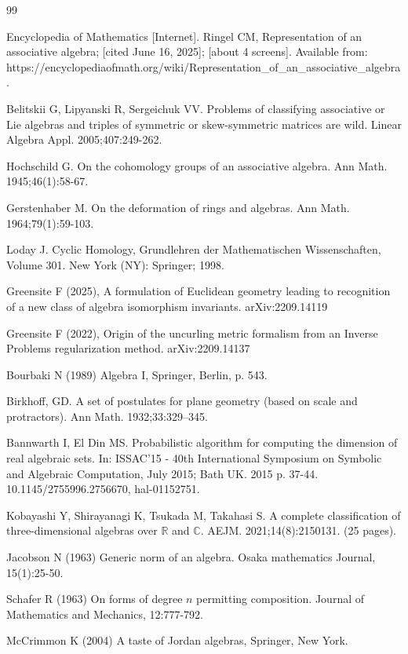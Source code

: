 \documentclass{amsart}
\theoremstyle{definition}
\numberwithin{theorem}{section}
\numberwithin{equation}{section}
\begin{document}
   \begin{thebibliography}{99}
   
 Encyclopedia of Mathematics [Internet].  Ringel CM, Representation of an associative algebra; [cited June 16, 2025]; [about 4 screens]. Available from: \\ https://encyclopediaofmath.org/wiki/Representation\_of\_an\_associative\_algebra.
          
        Belitskii G, Lipyanski R, Sergeichuk VV.  Problems of classifying associative or Lie algebras and triples of symmetric or skew-symmetric matrices are wild.  Linear Algebra Appl.  2005;407:249-262.
       
            Hochschild G.  On the cohomology groups of an associative algebra.   Ann Math.  1945;46(1):58-67.
       
             Gerstenhaber M.  On the deformation of rings and algebras.  Ann Math.  1964;79(1):59-103.
             
             Loday J. Cyclic Homology, Grundlehren der Mathematischen Wissenschaften, Volume 301.  New York (NY): Springer; 1998.              
            
             Greensite F (2025), A formulation of Euclidean geometry leading to recognition of a new class of algebra isomorphism invariants. arXiv:2209.14119

 Greensite F (2022), Origin of the uncurling metric formalism from an Inverse Problems regularization method. arXiv:2209.14137      

 Bourbaki N (1989) Algebra I, Springer, Berlin, p. 543.   

 Birkhoff, GD.  A set of postulates for plane geometry (based on scale and protractors).  Ann Math.  1932;33:329–345.               


 Bannwarth I, El Din MS.  Probabilistic algorithm for computing the dimension of real algebraic sets. In: ISSAC'15 - 40th International Symposium on Symbolic and Algebraic Computation, July 2015; Bath UK. 2015 p. 37-44.  10.1145/2755996.2756670, hal-01152751.     
                 
 Kobayashi Y, Shirayanagi K, Tsukada M, Takahasi S.  A complete classification of three-dimensional algebras over $\mathbb{R}$ and $\mathbb{C}$.  AEJM.   2021;14(8):2150131. (25 pages).

               Jacobson N  (1963) Generic norm of an algebra. Osaka mathematics Journal, 15(1):25-50.
  
          Schafer R (1963) On forms of degree $n$ permitting composition. Journal of Mathematics and Mechanics, 12:777-792.       
      
        McCrimmon K (2004) A taste of Jordan algebras, Springer, New York.
 
      \end{thebibliography}
       
 
\end{document}
